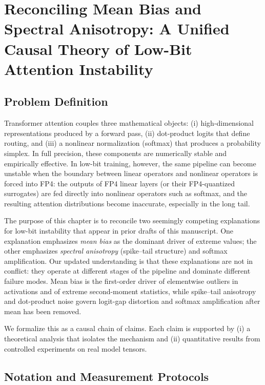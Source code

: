 \chapter{Reconciling Mean Bias and Spectral Anisotropy: A Unified Causal Theory of Low-Bit Attention Instability}
\label{chap:reconcile_bias_anisotropy}

\section{Problem Definition}

Transformer attention couples three mathematical objects: (i) high-dimensional representations produced by a forward pass, (ii) dot-product logits that define routing, and (iii) a nonlinear normalization (softmax) that produces a probability simplex. In full precision, these components are numerically stable and empirically effective. In low-bit training, however, the same pipeline can become unstable when the boundary between linear operators and nonlinear operators is forced into FP4: the outputs of FP4 linear layers (or their FP4-quantized surrogates) are fed directly into nonlinear operators such as softmax, and the resulting attention distributions become inaccurate, especially in the long tail.

The purpose of this chapter is to reconcile two seemingly competing explanations for low-bit instability that appear in prior drafts of this manuscript. One explanation emphasizes \emph{mean bias} as the dominant driver of extreme values; the other emphasizes \emph{spectral anisotropy} (spike--tail structure) and softmax amplification. Our updated understanding is that these explanations are not in conflict: they operate at different stages of the pipeline and dominate different failure modes. Mean bias is the first-order driver of elementwise outliers in activations and of extreme second-moment statistics, while spike--tail anisotropy and dot-product noise govern logit-gap distortion and softmax amplification after mean has been removed.

We formalize this as a causal chain of claims. Each claim is supported by (i) a theoretical analysis that isolates the mechanism and (ii) quantitative results from controlled experiments on real model tensors.

\section{Notation and Measurement Protocols}

